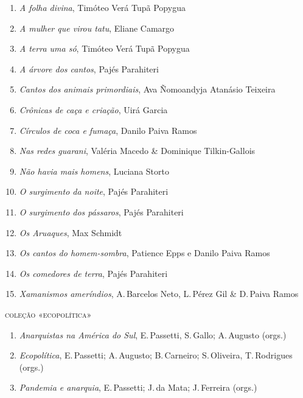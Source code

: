 \begin{enumerate}
\setlength\parskip{4.2pt}
\setlength\itemsep{-1.4mm}
\item \textit{A folha divina}, Timóteo Verá Tupã Popygua
\item \textit{A mulher que virou tatu}, Eliane Camargo
\item \textit{A terra uma só}, Timóteo Verá Tupã Popygua
\item \textit{A árvore dos cantos}, Pajés Parahiteri
\item \textit{Cantos dos animais primordiais}, Ava Ñomoandyja Atanásio Teixeira
\item \textit{Crônicas de caça e criação}, Uirá Garcia
\item \textit{Círculos de coca e fumaça}, Danilo Paiva Ramos
\item \textit{Nas redes guarani}, Valéria Macedo \& Dominique Tilkin-Gallois
\item \textit{Não havia mais homens}, Luciana Storto
\item \textit{O surgimento da noite}, Pajés Parahiteri
\item \textit{O surgimento dos pássaros}, Pajés Parahiteri
\item \textit{Os Aruaques}, Max Schmidt
\item \textit{Os cantos do homem-sombra}, Patience Epps e Danilo Paiva Ramos
\item \textit{Os comedores de terra}, Pajés Parahiteri
\item \textit{Xamanismos ameríndios}, A.\,Barcelos Neto, L.\,Pérez Gil \& D.\,Paiva Ramos
\end{enumerate}

\medskip
{\large\textsc{coleção «ecopolítica»}}

\begin{enumerate}
\setlength\parskip{4.2pt}
\setlength\itemsep{-1.4mm}
\item \textit{Anarquistas na América do Sul}, E.\,Passetti, S.\,Gallo; A.\,Augusto  (orgs.)
\item \textit{Ecopolítica}, E.\,Passetti; A.\,Augusto; B.\,Carneiro; S.\,Oliveira, T.\,Rodrigues  (orgs.)
\item \textit{Pandemia e anarquia}, E.\,Passetti; J.\,da Mata; J.\,Ferreira  (orgs.)
\end{enumerate}


